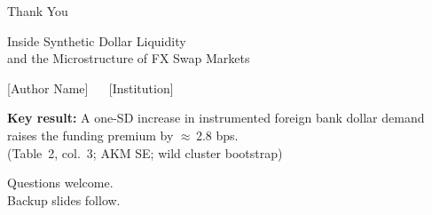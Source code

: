 \documentclass[aspectratio=169, 10pt]{beamer}
\begin{document}
\begin{frame}{Thank You}

  \begin{center}
    \bigskip
    \Large Inside Synthetic Dollar Liquidity\\
    and the Microstructure of FX Swap Markets

    \bigskip\bigskip

    {\normalsize [Author Name] $\quad$ [Institution]}

    \bigskip\bigskip

    \textbf{Key result:} A one-SD increase in instrumented foreign bank dollar demand
    raises the funding premium by $\approx$\,2.8 bps.\\
    {\color{dimgray}(Table~2, col.~3; AKM SE; wild cluster bootstrap)}

    \bigskip\bigskip

    {\color{dimgray}
      \small Questions welcome.\\[0.3em]
      Backup slides follow.}
  \end{center}

\end{frame}

\appendix
\end{document}
